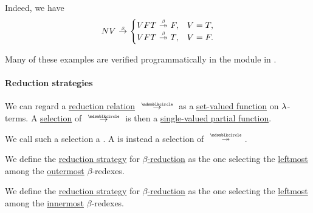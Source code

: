 \begin{example}
\begin{thmenum}
    Indeed, we have
    \begin{equation*}
      NV \bred \begin{cases}
        VFT \bred* F, &V = T, \\
        VFT \bred* T, &V = F.
      \end{cases}
    \end{equation*}
  \end{thmenum}
\end{example}
\begin{comments}
  \item Many of these examples are verified programmatically in the module  in \cite{notebook:code}.
\end{comments}

\paragraph{Reduction strategies}

\begin{definition}\label{def:reduction_strategy}
  We can regard a \hyperref[def:lambda_term_reduction]{reduction relation} \( {\pred} \) as a \hyperref[def:set_valued_map]{set-valued function} on \( {\mathrm \lambda} \)-terms. A \hyperref[def:function/selection]{selection} of \( {\pred} \) is then a \hyperref[def:set_valued_map/partial]{single-valued partial function}.

  We call such a selection a . A  is instead a selection of \( {\pred*} \).
\end{definition}

\begin{definition}\label{def:normal_order_reduction}
  We define the  \hyperref[def:reduction_strategy]{reduction strategy} for \hyperref[def:beta_eta_reduction]{\( \beta \)-reduction} as the one selecting the \hyperref[def:subterm_occurrence_ordering/horizontal]{leftmost} among the \hyperref[def:subterm_occurrence_ordering/vertical]{outermost} \( \beta \)-redexes.
\end{definition}

\begin{definition}\label{def:applicative_order_reduction}
  We define the  \hyperref[def:reduction_strategy]{reduction strategy} for \hyperref[def:beta_eta_reduction]{\( \beta \)-reduction} as the one selecting the \hyperref[def:subterm_occurrence_ordering/horizontal]{leftmost} among the \hyperref[def:subterm_occurrence_ordering/vertical]{innermost} \( \beta \)-redexes.
\end{definition}

